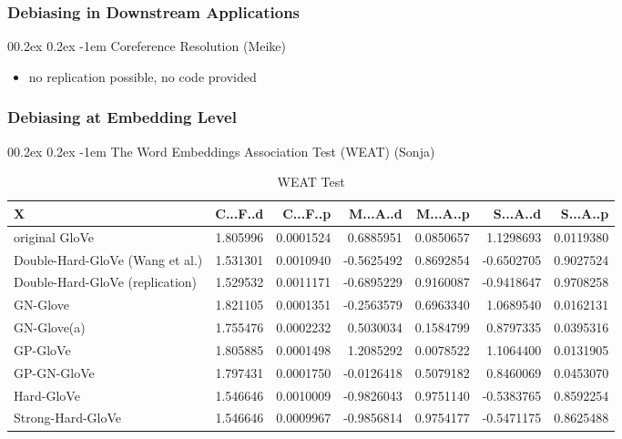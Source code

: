 \documentclass[
  english,
  man,floatsintext]{apa6}
\makeatletter
\providecommand{\tightlist}{%
  \setlength{\itemsep}{0pt}\setlength{\parskip}{0pt}}
\let\oldparagraph\paragraph
\renewcommand{\paragraph}[1]{\oldparagraph{#1}\mbox{}}
\renewcommand{\paragraph}{\@startsection{paragraph}{4}{\parindent}%
  {0\baselineskip \@plus 0.2ex \@minus 0.2ex}%
  {-1em}%
  {\normalfont\normalsize\bfseries\itshape\typesectitle}}
\makeatother
\begin{document}
\hypertarget{debiasing-in-downstream-applications}{%
\subsubsection{Debiasing in Downstream Applications}\label{debiasing-in-downstream-applications}}

\hypertarget{coreference-resolution-meike}{%
\paragraph{Coreference Resolution (Meike)}\label{coreference-resolution-meike}}

\begin{itemize}
\tightlist
\item
  no replication possible, no code provided
\end{itemize}

\hypertarget{debiasing-at-embedding-level}{%
\subsubsection{Debiasing at Embedding Level}\label{debiasing-at-embedding-level}}

\hypertarget{the-word-embeddings-association-test-weat-sonja}{%
\paragraph{The Word Embeddings Association Test (WEAT) (Sonja)}\label{the-word-embeddings-association-test-weat-sonja}}

\begin{table}

\caption{\label{tab:unnamed-chunk-2}WEAT Test}
\centering
\begin{tabular}[t]{l|r|r|r|r|r|r}
\hline
X & C...F..d & C...F..p & M...A..d & M...A..p & S...A..d & S...A..p\\
\hline
original GloVe & 1.805996 & 0.0001524 & 0.6885951 & 0.0850657 & 1.1298693 & 0.0119380\\
\hline
Double-Hard-GloVe (Wang et al.) & 1.531301 & 0.0010940 & -0.5625492 & 0.8692854 & -0.6502705 & 0.9027524\\
\hline
Double-Hard-GloVe (replication) & 1.529532 & 0.0011171 & -0.6895229 & 0.9160087 & -0.9418647 & 0.9708258\\
\hline
GN-Glove & 1.821105 & 0.0001351 & -0.2563579 & 0.6963340 & 1.0689540 & 0.0162131\\
\hline
GN-Glove(a) & 1.755476 & 0.0002232 & 0.5030034 & 0.1584799 & 0.8797335 & 0.0395316\\
\hline
GP-GloVe & 1.805885 & 0.0001498 & 1.2085292 & 0.0078522 & 1.1064400 & 0.0131905\\
\hline
GP-GN-GloVe & 1.797431 & 0.0001750 & -0.0126418 & 0.5079182 & 0.8460069 & 0.0453070\\
\hline
Hard-GloVe & 1.546646 & 0.0010009 & -0.9826043 & 0.9751140 & -0.5383765 & 0.8592254\\
\hline
Strong-Hard-GloVe & 1.546646 & 0.0009967 & -0.9856814 & 0.9754177 & -0.5471175 & 0.8625488\\
\hline
\end{tabular}
\end{table}
\end{document}
